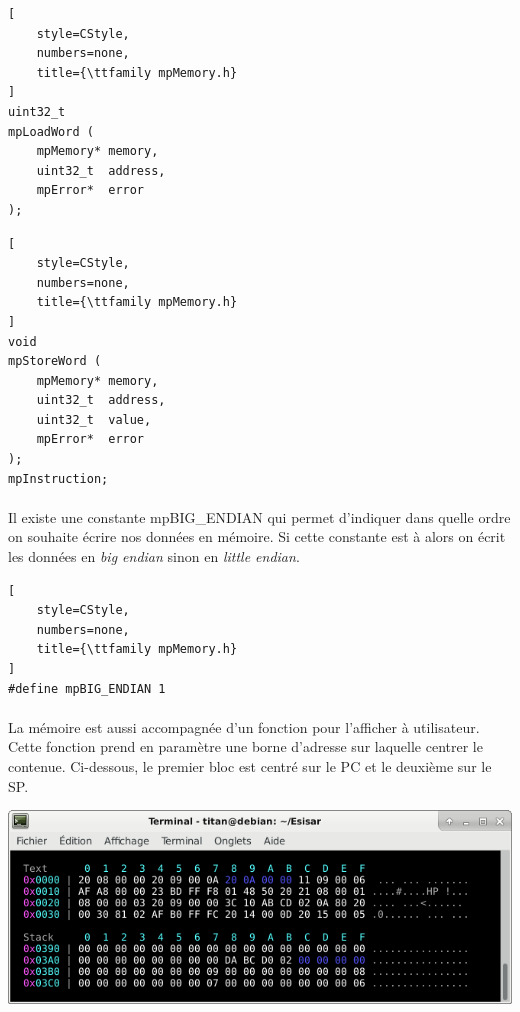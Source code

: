 \documentclass[12pt]{report} %
\begin{document}
\noindent
\begin{minipage}[t]{.45\textwidth}
\begin{lstlisting}[
    style=CStyle,
    numbers=none,
    title={\ttfamily mpMemory.h}
]
uint32_t
mpLoadWord (
    mpMemory* memory,
    uint32_t  address,
    mpError*  error
);
\end{lstlisting}
\end{minipage}\hfill
%
\begin{minipage}[t]{.45\textwidth}
\begin{lstlisting}[
    style=CStyle,
    numbers=none,
    title={\ttfamily mpMemory.h}
]
void
mpStoreWord (
    mpMemory* memory,
    uint32_t  address,
    uint32_t  value,
    mpError*  error
);
mpInstruction;
\end{lstlisting}
\end{minipage}

\paragraph{}
Il existe une constante {\ttfamily mpBIG\_ENDIAN} qui permet d'indiquer dans quelle ordre on souhaite écrire nos données en mémoire. Si cette constante est à {} alors on écrit les données en \textit{big endian} sinon en \textit{little endian}.

\begin{lstlisting}[
    style=CStyle,
    numbers=none,
    title={\ttfamily mpMemory.h}
]
#define mpBIG_ENDIAN 1
\end{lstlisting}

\paragraph{}
La mémoire est aussi accompagnée d'un fonction pour l'afficher à utilisateur. Cette fonction prend en paramètre une borne d'adresse sur laquelle centrer le contenue. Ci-dessous, le premier bloc est centré sur le {\ttfamily PC} et le deuxième sur le {\ttfamily SP}.

\begin{center}
    \includegraphics[width=\textwidth]{MIPS-mpMemory.png}
\end{center}
\end{document}
